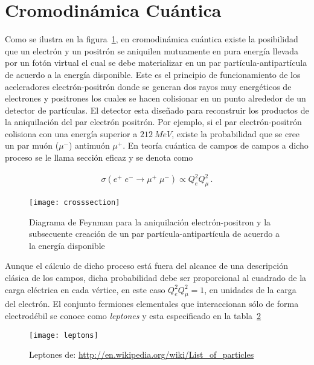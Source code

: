 
\section{Cromodinámica Cuántica}
\label{sec:inter-fuert}

Como se ilustra en la figura~\ref{fig:crosssection}, en cromodinámica cuántica existe la posibilidad que un electrón y un positrón se aniquilen mutuamente en pura energía llevada por un fotón virtual el cual se debe materializar en un par partícula-antipartícula de acuerdo a la energía disponible. Este es el principio de funcionamiento de los aceleradores electrón-positrón donde se generan dos rayos muy energéticos de electrones y positrones los cuales se hacen colisionar en un punto alrededor de un detector de partículas. El detector esta diseñado para reconstruir los productos de la aniquilación del par electrón positrón. Por ejemplo, si el par electrón-positrón colisiona con una energía superior a $\SI{212}{MeV}$, existe la probabilidad que se cree un par muón ($\mu^-$) antimuón $\mu^{+}$. En teoría cuántica de campos de campos a dicho proceso se le llama sección eficaz y se denota como
\begin{frame}
\begin{align}
  \sigma(e^+\;e^-\rightarrow \mu^+\;\mu^-)\propto Q_e^2 Q_\mu^2\,.
\end{align}

\begin{figure}
  \centering
  \texttt{[image: crosssection]}
  \caption{Diagrama de Feynman para la aniquilación electrón-positron y la subsecuente creación de un par partícula-antipartícula de acuerdo a la energía disponible}
  \label{fig:crosssection}
\end{figure}
\end{frame}
Aunque el cálculo de dicho proceso está fuera del alcance de una descripción clásica de los campos, dicha probabilidad debe ser proporcional al cuadrado de la carga eléctrica en cada vértice, en este caso $Q_e^2Q_{\mu}^2=1$, en unidades de la carga del electrón. El conjunto fermiones elementales que interaccionan sólo de forma electrodébil se conoce como \emph{leptones} y esta especificado en la tabla~\ref{tab:leptons}
\begin{frame}
\begin{figure}
  \centering
  \texttt{[image: leptons]}
  \caption{Leptones de: \url{http://en.wikipedia.org/wiki/List_of_particles}}
  \label{tab:leptons}
\end{figure}
\end{frame}

